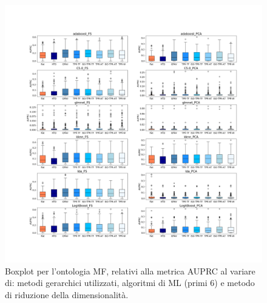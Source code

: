 \documentclass[12pt]{report}
\begin{document}
\begin{appendices}
\begin{figure}[h]
 \hspace*{-2.6cm}
\includegraphics[scale=0.34]{./images/MF_PRC_1.png}
\caption{\footnotesize{Boxplot per l'ontologia MF, relativi alla metrica AUPRC al variare di: metodi gerarchici utilizzati, algoritmi di ML (primi 6) e metodo di riduzione della dimensionalità.}}
\label{MF_PRC_1}
\end{figure}


\end{appendices}
\end{document}
